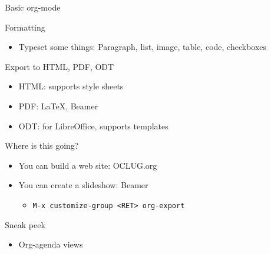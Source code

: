 \documentclass[presentation]{beamer}
\begin{document}
\begin{frame}[label={sec:org4315d56},fragile]{Basic org-mode}
 \begin{block}{Formatting}
\begin{itemize}
\item Typeset some things: Paragraph, list, image, table, code,
checkboxes
\end{itemize}
\end{block}
\begin{block}{Export to HTML, PDF, ODT}
\begin{itemize}
\item HTML: supports style sheets
\item PDF: \LaTeX{}, Beamer
\item ODT: for LibreOffice, supports templates
\end{itemize}
\end{block}
\begin{block}{Where is this going?}
\begin{itemize}
\item You can build a web site: OCLUG.org
\item You can create a slideshow: Beamer
\begin{itemize}
\item \texttt{M-x customize-group <RET> org-export}
\end{itemize}
\end{itemize}
\end{block}
\end{frame}
\begin{frame}[label={sec:orge195f58}]{Sneak peek}
\begin{itemize}
\item Org-agenda views
\end{itemize}
\end{frame}
\end{document}
